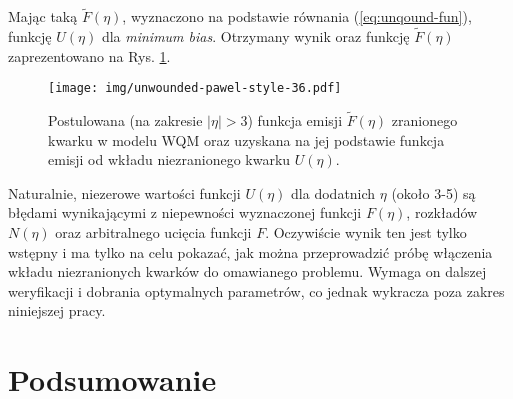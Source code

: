\documentclass[a4paper,12pt]{article}
\begin{document}
Mając taką $\widetilde{F}(\eta)$, wyznaczono na podstawie równania (\ref{eq:unqound-fun}), funkcję $U(\eta)$ dla \textit{minimum bias}. Otrzymany wynik oraz funkcję $\widetilde{F}(\eta)$ zaprezentowano na Rys. \ref{fig:unwound-fun}.

\begin{figure}[H]
	\begin{center}
	\texttt{[image: img/unwounded-pawel-style-36.pdf]}
	\vspace{-0.1in}
		\caption{ Postulowana (na zakresie $|\eta| > 3$) funkcja emisji $\widetilde{F}(\eta)$ zranionego kwarku w modelu WQM  oraz uzyskana na jej podstawie funkcja emisji od wkładu niezranionego kwarku $U(\eta)$.} \label{fig:unwound-fun}
	\end{center}
\end{figure}

Naturalnie, niezerowe wartości funkcji $U(\eta)$ dla dodatnich $\eta$ (około 3-5) są błędami wynikającymi z niepewności wyznaczonej funkcji $F(\eta)$, rozkładów $N(\eta)$ oraz arbitralnego ucięcia funkcji $F$. Oczywiście wynik ten jest tylko wstępny i ma tylko na celu pokazać, jak można przeprowadzić próbę włączenia wkładu niezranionych kwarków do omawianego problemu. Wymaga on dalszej weryfikacji i dobrania optymalnych parametrów, co jednak wykracza poza zakres niniejszej pracy.

\newpage
\section{Podsumowanie}
\end{document}
